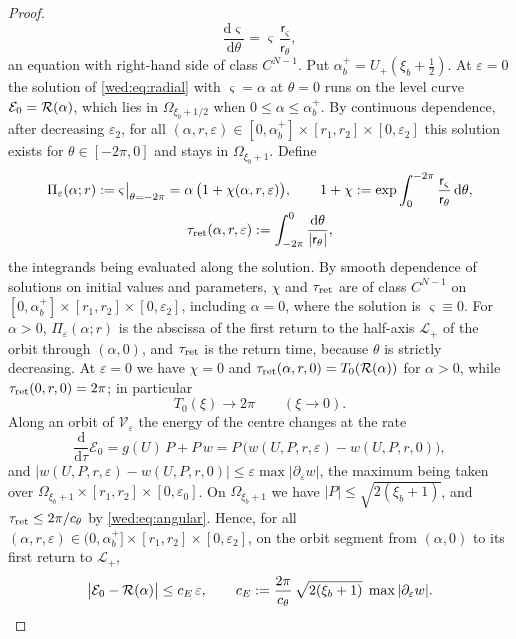 \begin{proof}
\begin{equation}\label{wed:eq:radial}
\frac{\mathrm d\varsigma}{\mathrm d\theta}=\varsigma\,\frac{\mathsf r_\varsigma}{\mathsf r_\theta},
\end{equation}
an equation with right-hand side of class $C^{N-1}$. Put $\alpha_b^+=U_+(\xi_b+\tfrac12)$. At $\varepsilon=0$ the solution of \eqref{wed:eq:radial} with $\varsigma=\alpha$ at $\theta=0$ runs on the level curve $\mathcal E_0=\mathcal R(\alpha)$, which lies in $\Omega_{\xi_b+1/2}$ when $0\le\alpha\le\alpha_b^+$. By continuous dependence, after decreasing $\varepsilon_2$, for all $(\alpha,r,\varepsilon)\in[0,\alpha_b^+]\times[r_1,r_2]\times[0,\varepsilon_2]$ this solution exists for $\theta\in[-2\pi,0]$ and stays in $\Omega_{\xi_b+1}$. Define
\begin{gather*}
\Pi_\varepsilon(\alpha;r):=\varsigma\big|_{\theta=-2\pi}=\alpha\,\bigl(1+\chi(\alpha,r,\varepsilon)\bigr),\qquad
1+\chi:=\exp\int_0^{-2\pi}\frac{\mathsf r_\varsigma}{\mathsf r_\theta}\,\mathrm d\theta,\\
\tau_{\rm ret}(\alpha,r,\varepsilon):=\int_{-2\pi}^{0}\frac{\mathrm d\theta}{|\mathsf r_\theta|},
\end{gather*}
the integrands being evaluated along the solution. By smooth dependence of solutions on initial values and parameters, $\chi$ and $\tau_{\rm ret}$ are of class $C^{N-1}$ on $[0,\alpha_b^+]\times[r_1,r_2]\times[0,\varepsilon_2]$, including $\alpha=0$, where the solution is $\varsigma\equiv0$. For $\alpha>0$, $\Pi_\varepsilon(\alpha;r)$ is the abscissa of the first return to the half-axis $\mathcal L_+$ of the orbit through $(\alpha,0)$, and $\tau_{\rm ret}$ is the return time, because $\theta$ is strictly decreasing. At $\varepsilon=0$ we have $\chi=0$ and $\tau_{\rm ret}(\alpha,r,0)=T_0(\mathcal R(\alpha))$ for $\alpha>0$, while $\tau_{\rm ret}(0,r,0)=2\pi$; in particular
\begin{equation}\label{wed:eq:periodlimit}
T_0(\xi)\to2\pi\qquad(\xi\to0).
\end{equation}
Along an orbit of $\mathcal V_\varepsilon$ the energy of the centre changes at the rate
\[
\frac{\mathrm d}{\mathrm d\tau}\mathcal E_0=g(U)\,P+P\,w=P\,\bigl(w(U,P,r,\varepsilon)-w(U,P,r,0)\bigr),
\]
and $|w(U,P,r,\varepsilon)-w(U,P,r,0)|\le\varepsilon\max|\partial_\varepsilon w|$, the maximum being taken over $\Omega_{\xi_b+1}\times[r_1,r_2]\times[0,\varepsilon_0]$. On $\Omega_{\xi_b+1}$ we have $|P|\le\sqrt{2(\xi_b+1)}$, and $\tau_{\rm ret}\le2\pi/c_\theta$ by \eqref{wed:eq:angular}. Hence, for all $(\alpha,r,\varepsilon)\in(0,\alpha_b^+]\times[r_1,r_2]\times[0,\varepsilon_2]$, on the orbit segment from $(\alpha,0)$ to its first return to $\mathcal L_+$,
\begin{equation}\label{wed:eq:energydrift}
\bigl|\mathcal E_0-\mathcal R(\alpha)\bigr|\le c_E\,\varepsilon,\qquad
c_E:=\frac{2\pi}{c_\theta}\,\sqrt{2(\xi_b+1)}\;\max|\partial_\varepsilon w| .
\end{equation}


\end{proof}
